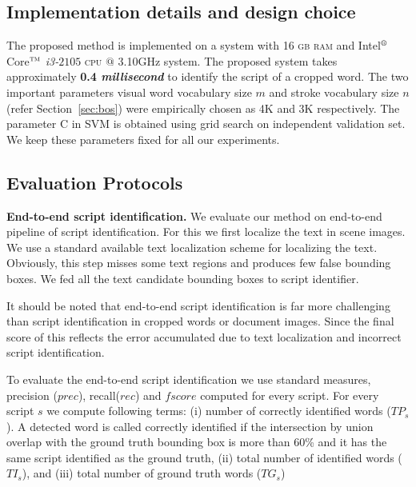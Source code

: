 \subsection{Implementation details and design choice}
The proposed method is implemented on a system with 16 \textsc{gb ram} and
Intel${^\noit\textregistered}$ Core$^{\textup{\textsc{\scriptsize{tm}}}}$ \textit{i3-$2105$} \textsc{cpu} $@$ 3.10GHz system. The proposed system takes approximately \textbf{0.4 \textit{millisecond}} to identify the script of a cropped word. The two important parameters visual word vocabulary size $m$ and stroke vocabulary size $n$ (refer Section~\ref{sec:bos}) were empirically chosen as 4K and 3K respectively. The parameter C in SVM is obtained using grid search on independent validation set. We keep these parameters fixed for all our experiments.  

\subsection{Evaluation Protocols}
\label{sec:perf}
\noindent \textbf{End-to-end script identification.}
We evaluate our method on end-to-end pipeline of script
identification. For this we first localize the text 
in scene images. We use a standard available text localization
scheme for localizing the text. Obviously, this step misses 
some text regions and produces few false bounding boxes. 
We fed all the text candidate bounding boxes to script identifier.

It should be noted that end-to-end script
identification is far more challenging than
script identification in cropped words or
document images. Since the final score of
this reflects the error accumulated due to text localization
and incorrect script identification.

To evaluate the end-to-end script identification
we use standard measures, precision ($prec$),
recall($rec$) and $fscore$ computed for every script.
For every script $s$ we compute following terms: 
(i) number of correctly identified words ($TP_s$). A detected word
is called correctly identified if the intersection
by union overlap with the ground truth bounding box is more than 60\%
and it has the same script identified as the ground truth,
(ii) total number of identified words ($TI_s$), and
(iii) total number of ground truth words ($TG_s$)
 
